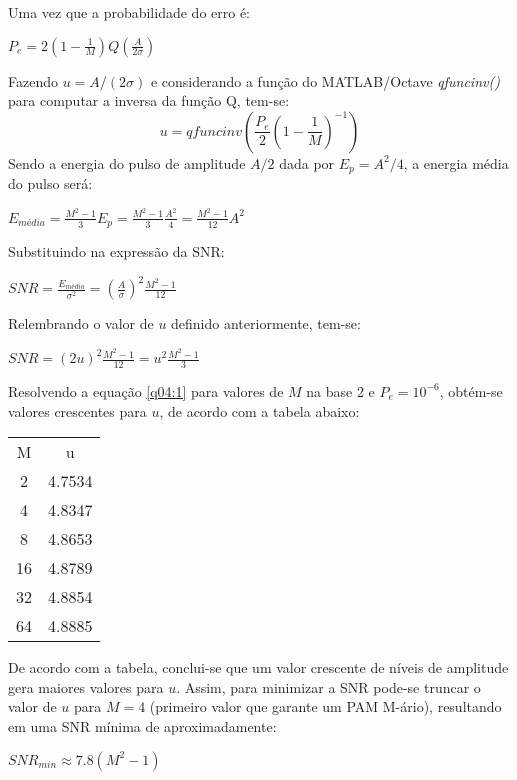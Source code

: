 Uma vez que a probabilidade do erro é:

\begin{center}
    $P_e = 2\left(1-\frac{1}{M}\right) Q\left(\frac{A}{2\sigma}\right)$
\end{center}

Fazendo $u = A/(2\sigma)$ e considerando a função do MATLAB/Octave \textit{qfuncinv()} para computar a inversa da função Q, tem-se:
\begin{equation} \label{q04:1}
    u = qfuncinv\left(\frac{P_e}{2}\left(1-\frac{1}{M}\right)^{-1} \right)
\end{equation}
Sendo a energia do pulso de amplitude $A/2$ dada por $E_p = A^2/4$, a energia média do pulso será:
\begin{center}
    $E_{média} = \frac{M^2-1}{3}E_p = \frac{M^2-1}{3} \frac{A^2}{4} = \frac{M^2-1}{12} A^2$
\end{center}
Substituindo na expressão da SNR:
\begin{center}
    $SNR = \frac{E_{média}}{\sigma^2} = \left(\frac{A}{\sigma}\right)^2\frac{M^2-1}{12}$
\end{center}
Relembrando o valor de $u$ definido anteriormente, tem-se:
\begin{center}
    $SNR =  (2u)^2\frac{M^2-1}{12} =u^2\frac{M^2-1}{3}$ 
\end{center}

Resolvendo a equação \ref{q04:1} para valores de $M$ na base 2 e $P_e=10^{-6}$, obtém-se valores crescentes para $u$, de acordo com a tabela abaixo:

\begin{table}[H]
\centering
\begin{tabular}{|c|c|}
\cline{1-2} M & u \\
\cline{1-2} 2 & 4.7534 \\
\cline{1-2} 4 & 4.8347 \\
\cline{1-2} 8 & 4.8653 \\
\cline{1-2} 16 & 4.8789 \\
\cline{1-2} 32 & 4.8854 \\
\cline{1-2} 64 & 4.8885 \\ \cline{1-2} 
\end{tabular}
\end{table}

De acordo com a tabela, conclui-se que um valor crescente de níveis de amplitude gera maiores valores para $u$. Assim, para minimizar a SNR pode-se truncar o valor de $u$ para $M=4$ (primeiro valor que garante um PAM M-ário), resultando em uma SNR mínima de aproximadamente:

\begin{center}
    $SNR_{min} \approx 7.8(M^2-1)$
\end{center}





\newpage